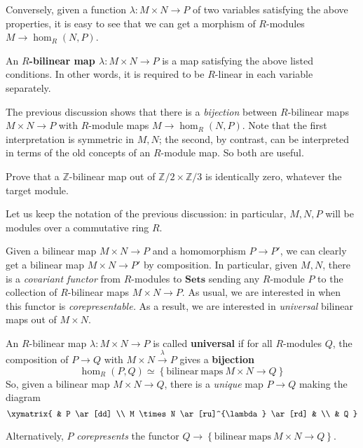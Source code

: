 Conversely, given a function $\lambda: M \times N \to P$ of two variables satisfying the above properties,
it is easy to see that we can get a morphism of $R$-modules $M \to
\hom_R(N,P)$.



\begin{definition}
An \textbf{$R$-bilinear map $\lambda: M \times N \to P$} is a map satisfying
the above listed conditions. In other words, it is required to be $R$-linear
in each variable separately.
\end{definition}

The previous discussion shows that there is a \emph{bijection} between $R$-bilinear
maps $M \times N \to P$ with $R$-module maps $M \to \hom_R(N,P)$.
Note that the first interpretation is symmetric in $M,N$; the second, by
contrast, can be interpreted in terms of the old concepts of an $R$-module map.
So both are useful.

\begin{exercise}
Prove that a $\mathbb{Z}$-bilinear map out of $\mathbb{Z}/2 \times
\mathbb{Z}/3$ is identically zero, whatever the target module.
\end{exercise}


Let us keep the notation of the previous discussion: in particular, $M,N, P$ will
be modules over a commutative ring $R$.

Given a bilinear map $M \times N \to P$ and a homomorphism $P \to P'$, we can
clearly get a bilinear map $M \times N \to P'$ by composition.
In particular, given $M,N$, there is a \emph{covariant functor} from
$R$-modules to
$\mathbf{Sets}$ sending  any $R$-module $P$ to the collection of $R$-bilinear
maps $M \times N
\to P$. As usual, we are interested in when this functor is
\emph{corepresentable.}
As  a result,
we are interested in \emph{universal} bilinear maps out of $M \times N$.


\begin{definition}
An $R$-bilinear map $\lambda: M \times N \to P$ is called \textbf{universal} if
for all $R$-modules $Q$, the composition of $P \to Q$ with $M \times N
\stackrel{\lambda}{\to} P$
gives a \textbf{bijection}
\[ \hom_R(P,Q) \simeq \left\{\mathrm{bilinear \ maps} \ M \times N \to
Q\right\}  \]
So, given a bilinear map $M \times N \to Q$, there is a \textit{unique} map $P
\to Q$ making the diagram
\[
\xymatrix{
& P \ar[dd] \\
M \times N \ar[ru]^{\lambda} \ar[rd] & \\
& Q
}
\]

Alternatively, $P$ \emph{corepresents} the functor $Q \to
\left\{\mathrm{bilinear \ maps \ } M \times N \to Q\right\}$.
\end{definition}

